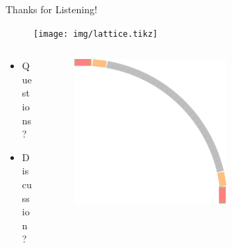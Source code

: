 \documentclass{beamer}
\begin{document}
\begin{frame}[t,fragile]{Thanks for Listening!}
\begin{figure}
\centering
\texttt{[image: img/lattice.tikz]}
\end{figure}
\begin{columns}
\begin{column}{0.6\textwidth}
\begin{itemize}
\item Questions?
\item Discussion?
\end{itemize}
\end{column}
\begin{column}{0.4\textwidth}  
    \begin{figure}
       \centering
       \includegraphics[width=0.6\textwidth]{img/quarterring.pdf}
       \end{figure}
\end{column}
\end{columns}
\end{frame}
\end{document}
